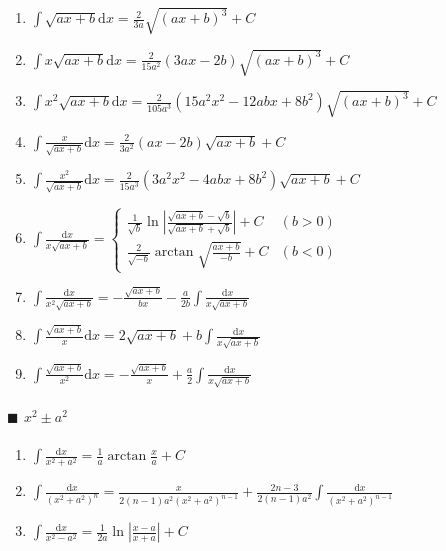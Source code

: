 \begin{enumerate}

\item $ \int \sqrt{ax+b} \mathrm{d}x = \frac{2}{3a} \sqrt{(ax+b)^3} + C $

\item $ \int x \sqrt{ax+b} \mathrm{d}x = \frac{2}{15a^2}(3ax-2b) \sqrt{(ax+b)^3} + C $

\item $ \int x^2 \sqrt{ax+b} \mathrm{d}x = \frac{2}{105a^3}(15a^2x^2-12abx+8b^2)\sqrt{(ax+b)^3} + C $

\item $ \int \frac{x}{\sqrt{ax+b}} \mathrm{d}x = \frac{2}{3a^2} (ax-2b) \sqrt{ax+b} + C $

\item $ \int \frac{x^2}{\sqrt{ax+b}} \mathrm{d} x = \frac{2}{15a^3} (3a^2x^2 - 4abx + 8b^2) \sqrt{ax+b} + C $

\item $ \int \frac{\mathrm{d} x}{x\sqrt{ax+b}} = \begin{cases}
\frac{1}{\sqrt{b}}\ln\left| \frac{\sqrt{ax+b} - \sqrt{b}}{\sqrt{ax+b} + \sqrt{b}} \right| + C & (b>0) \\
\frac{2}{\sqrt{-b}}\arctan\sqrt{\frac{ax+b}{-b}} + C & (b<0)
\end{cases} $

\item $ \int \frac{\mathrm{d} x}{x^2\sqrt{ax+b}} = -\frac{\sqrt{ax+b}}{bx} - \frac{a}{2b} \int \frac{\mathrm{d} x}{x\sqrt{ax+b}} $

\item $ \int \frac{\sqrt{ax+b}}{x}\mathrm{d} x = 2\sqrt{ax+b} + b\int\frac{\mathrm{d} x}{x\sqrt{ax+b}} $

\item $ \int \frac{\sqrt{ax+b}}{x^2}\mathrm{d}x = -\frac{\sqrt{ax+b}}{x} + \frac{a}{2} \int \frac{\mathrm{d}x}{x\sqrt{ax+b}} $

\end{enumerate}

\paragraph{$\blacksquare$ $x^2 \pm a^2$}

\begin{enumerate}

\item $ \int \frac{\mathrm{d}x}{x^2 + a^2} = \frac{1}{a} \arctan\frac{x}{a} + C$

\item $ \int \frac{\mathrm{d}x}{(x^2+a^2)^n} = \frac{x}{2(n-1)a^2(x^2+a^2)^{n-1}}+\frac{2n-3}{2(n-1)a^2} \int \frac{\mathrm{d}x}{(x^2+a^2)^{n-1}} $

\item $\int \frac{\mathrm{d}x}{x^2-a^2} = \frac{1}{2a}\ln\left| \frac{x-a}{x+a} \right| + C $


\end{enumerate}

